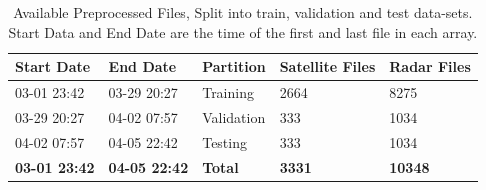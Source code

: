 \documentclass[acmtog, screen, balance]{acmart}
\begin{document}
\begin{table}[]
  \caption{Available Preprocessed Files, Split into train, validation and test data-sets. Start Data and End Date are the time of the first and last file in each array.}
  \begin{tabular}{@{}lllll@{}}
  \toprule
  Start Date          & End Date            & Partition  & Satellite Files & Radar Files \\ \midrule
  03-01 23:42 & 03-29 20:27 & Training   & 2664            & 8275        \\
  03-29 20:27 & 04-02 07:57 & Validation & 333             & 1034        \\
  04-02 07:57 & 04-05 22:42 & Testing    & 333             & 1034        \\
  \textbf{03-01 23:42} & \textbf{04-05 22:42} & \textbf{Total}      & \textbf{3331}            & \textbf{10348}       \\ \bottomrule
  \end{tabular}
  \label{tab:data}
\end{table}
\end{document}
